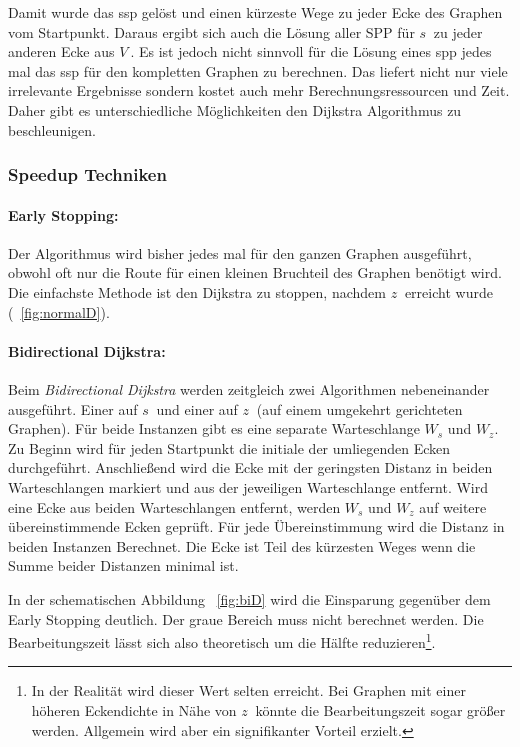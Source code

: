 Damit wurde das \gls{ssp} gelöst und einen kürzeste Wege zu jeder Ecke des Graphen vom Startpunkt.
Daraus ergibt sich auch die Lösung aller SPP für $s~$ zu jeder anderen Ecke aus $V~$.
Es ist jedoch nicht sinnvoll für die Lösung eines \gls{spp} jedes mal das \gls{ssp} für den kompletten Graphen zu berechnen.
Das liefert nicht nur viele irrelevante Ergebnisse sondern kostet auch mehr Berechnungsressourcen und Zeit.
Daher gibt es unterschiedliche Möglichkeiten den Dijkstra Algorithmus zu beschleunigen.

\subsubsection{Speedup Techniken}

\paragraph*{Early Stopping:}
Der Algorithmus wird bisher jedes mal für den ganzen Graphen ausgeführt, obwohl oft nur die Route für einen kleinen Bruchteil des Graphen benötigt wird.
Die einfachste Methode ist den Dijkstra zu stoppen, nachdem $z~$ erreicht wurde (~\ref{fig:normalD}).

\paragraph*{Bidirectional Dijkstra:}
Beim \textit{Bidirectional Dijkstra} werden zeitgleich zwei Algorithmen nebeneinander ausgeführt.
Einer auf $s~$ und einer auf $z~$ (auf einem umgekehrt gerichteten Graphen).
Für beide Instanzen gibt es eine separate Warteschlange $W_{s}$ und $W_{z}$.
Zu Beginn wird für jeden Startpunkt die initiale der umliegenden Ecken durchgeführt.
Anschließend wird die Ecke mit der geringsten Distanz in beiden Warteschlangen markiert und aus der jeweiligen Warteschlange entfernt.
Wird eine Ecke aus beiden Warteschlangen entfernt, werden $W_{s}$ und $W_{z}$ auf weitere übereinstimmende Ecken geprüft.
Für jede Übereinstimmung wird die Distanz in beiden Instanzen Berechnet.
Die Ecke ist Teil des kürzesten Weges wenn die Summe beider Distanzen minimal ist.\par
In der schematischen Abbildung ~\ref{fig:biD} wird die Einsparung gegenüber dem Early Stopping deutlich.
Der graue Bereich muss nicht berechnet werden.
Die Bearbeitungszeit lässt sich also theoretisch um die Hälfte reduzieren\footnote{In der Realität wird dieser Wert selten erreicht.
Bei Graphen mit einer höheren Eckendichte in Nähe von $z~$ könnte die Bearbeitungszeit sogar größer werden.
Allgemein wird aber ein signifikanter Vorteil erzielt.}.

